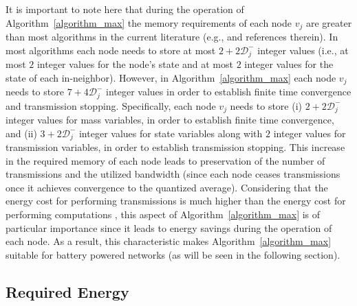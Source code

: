 \documentclass[twocolumn]{autart}    %
\begin{document}
It is important to note here that during the operation of Algorithm~\ref{algorithm_max} the memory requirements of each node $v_j$ are greater than most algorithms in the current literature (e.g., \cite{2016:Chamie_Basar, 2011:Cai_Ishii} and references therein).
In most algorithms each node needs to store at most $2 + 2 \mathcal{D}_{j}^-$ integer values (i.e., at most $2$ integer values for the node's state and at most $2$ integer values for the state of each in-neighbor). 
However, in Algorithm~\ref{algorithm_max} each node $v_j$ needs to store $7 + 4 \mathcal{D}_{j}^-$ integer values in order to establish finite time convergence and transmission stopping. 
Specifically, each node $v_j$ needs to store (i) $2 + 2 \mathcal{D}_{j}^-$ integer values for mass variables, in order to establish finite time convergence, and (ii) $3 + 2 \mathcal{D}_{j}^-$ integer values for state variables along with $2$ integer values for transmission variables, in order to establish transmission stopping. 
This increase in the required memory of each node leads to preservation of the number of transmissions and the utilized bandwidth (since each node ceases transmissions once it achieves convergence to the quantized average). 
Considering that the energy cost for performing transmissions is much higher than the energy cost for performing computations \cite{2002:Chandrakasan}, this aspect of Algorithm~\ref{algorithm_max} is of particular importance since it leads to energy savings during the operation of each node. 
As a result, this characteristic makes Algorithm~\ref{algorithm_max} suitable for battery powered networks (as will be seen in the following section). 


\subsection{Required Energy}
\end{document}
